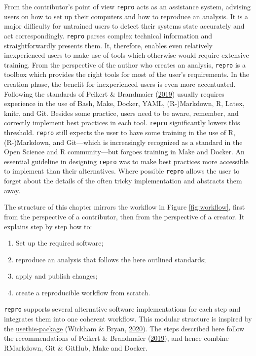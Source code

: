 \documentclass[12pt,a4paper,twoside]{article}
\providecommand{\tightlist}{%
  \setlength{\itemsep}{0pt}\setlength{\parskip}{0pt}}
\begin{document}
From the contributor's point of view \texttt{repro} acts as an assistance system, advising users on how to set up their computers and how to reproduce an analysis.
It is a major difficulty for untrained users to detect their systems state accurately and act correspondingly.
\texttt{repro} parses complex technical information and straightforwardly presents them.
It, therefore, enables even relatively inexperienced users to make use of tools which otherwise would require extensive training.
From the perspective of the author who creates an analysis, \texttt{repro} is a toolbox which provides the right tools for most of the user's requirements.
In the creation phase, the benefit for inexperienced users is even more accentuated.
Following the standards of Peikert \& Brandmaier (\protect\hyperlink{ref-peikertReproducibleDataAnalysis2019}{2019}) usually requires experience in the use of Bash, Make, Docker, YAML, (R-)Markdown, R, Latex, knitr, and Git.
Besides some practice, users need to be aware, remember, and correctly implement best practices in each tool.
\texttt{repro} significantly lowers this threshold.
\texttt{repro} still expects the user to have some training in the use of R, (R-)Markdown, and Git---which is increasingly recognized as a standard in the Open Science and R community---but forgoes training in Make and Docker.
An essential guideline in designing \texttt{repro} was to make best practices more accessible to implement than their alternatives.
Where possible \texttt{repro} allows the user to forget about the details of the often tricky implementation and abstracts them away.

The structure of this chapter mirrors the workflow in Figure \ref{fig:workflow}, first from the perspective of a contributor, then from the perspective of a creator.
It explains step by step how to:

\begin{enumerate}
\def\labelenumi{\arabic{enumi}.}
\tightlist
\item
  Set up the required software;
\item
  reproduce an analysis that follows the here outlined standards;
\item
  apply and publish changes;
\item
  create a reproducible workflow from scratch.
\end{enumerate}

\texttt{repro} supports several alternative software implementations for each step and integrates them into one coherent workflow.
This modular structure is inspired by the \href{https://usethis.r-lib.org}{usethis-package} (Wickham \& Bryan, \protect\hyperlink{ref-R-usethis}{2020}).
The steps described here follow the recommendations of Peikert \& Brandmaier (\protect\hyperlink{ref-peikertReproducibleDataAnalysis2019}{2019}), and hence combine RMarkdown, Git \& GitHub, Make and Docker.
\end{document}
